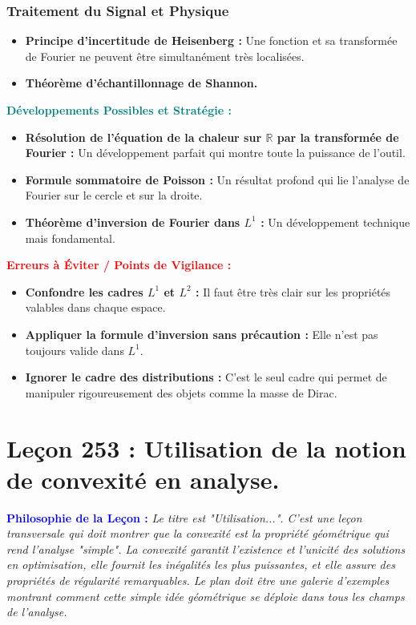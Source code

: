 \documentclass[12pt, a4paper, parskip=full]{report}
\theoremstyle{agregstyle}
\newenvironment{philosophie}
  {\par\medskip\noindent\begin{oframed}\noindent\textbf{\textcolor{blue}{Philosophie de la Leçon :}}\itshape}
  {\end{oframed}\par\medskip}
\newenvironment{developpements}
  {\par\medskip\noindent\begin{oframed}\noindent\textbf{\textcolor{teal}{Développements Possibles et Stratégie :}}}
  {\end{oframed}\par\medskip}
\newenvironment{erreurs}
  {\par\medskip\noindent\begin{oframed}\noindent\textbf{\textcolor{red}{Erreurs à Éviter / Points de Vigilance :}}}
  {\end{oframed}\par\medskip}
\begin{document}
\subsection{Traitement du Signal et Physique}
\begin{itemize}
    \item \textbf{Principe d'incertitude de Heisenberg :} Une fonction et sa transformée de Fourier ne peuvent être simultanément très localisées.
    \item \textbf{Théorème d'échantillonnage de Shannon.}
\end{itemize}

\begin{developpements}
    \begin{itemize}
        \item \textbf{Résolution de l'équation de la chaleur sur $\mathbb{R}$ par la transformée de Fourier :} Un développement parfait qui montre toute la puissance de l'outil.
        \item \textbf{Formule sommatoire de Poisson :} Un résultat profond qui lie l'analyse de Fourier sur le cercle et sur la droite.
        \item \textbf{Théorème d'inversion de Fourier dans $L^1$ :} Un développement technique mais fondamental.
    \end{itemize}
\end{developpements}

\begin{erreurs}
    \begin{itemize}
        \item \textbf{Confondre les cadres $L^1$ et $L^2$ :} Il faut être très clair sur les propriétés valables dans chaque espace.
        \item \textbf{Appliquer la formule d'inversion sans précaution :} Elle n'est pas toujours valide dans $L^1$.
        \item \textbf{Ignorer le cadre des distributions :} C'est le seul cadre qui permet de manipuler rigoureusement des objets comme la masse de Dirac.
    \end{itemize}
\end{erreurs}
\chapter{Leçon 253 : Utilisation de la notion de convexité en analyse.}

\begin{philosophie}
    Le titre est "Utilisation...". C'est une leçon transversale qui doit montrer que la convexité est la propriété géométrique qui rend l'analyse "simple". La convexité garantit l'existence et l'unicité des solutions en optimisation, elle fournit les inégalités les plus puissantes, et elle assure des propriétés de régularité remarquables. Le plan doit être une galerie d'exemples montrant comment cette simple idée géométrique se déploie dans tous les champs de l'analyse.
\end{philosophie}
\end{document}
